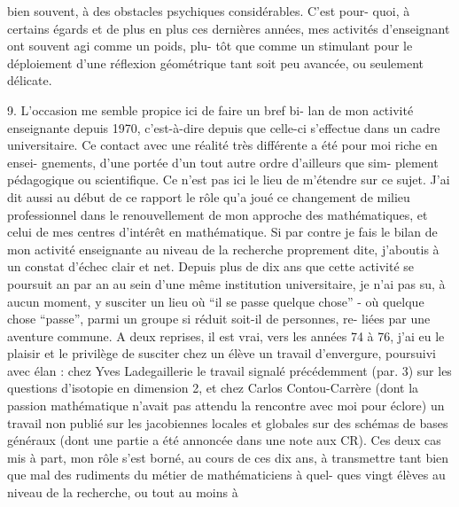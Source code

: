 
bien souvent, à des obstacles psychiques considérables. C'est pour-%
quoi, à certains égards et de plus en plus ces dernières années,
mes activités d'enseignant ont souvent agi comme un poids, plu-%
tôt que comme un stimulant pour le déploiement d'une réflexion
géométrique tant soit peu avancée, ou seulement délicate.

9. L'occasion me semble propice ici de faire un bref bi-%
lan de mon activité enseignante depuis 1970, c'est-à-dire depuis
que celle-ci s'effectue dans un cadre universitaire. Ce contact
avec une réalité très différente a été pour moi riche en ensei-%
gnements, d'une portée d'un tout autre ordre d'ailleurs que sim-%
plement pédagogique ou scientifique. Ce n'est pas ici le lieu de
m'étendre sur ce sujet. J'ai dit aussi au début de ce rapport le
rôle qu'a joué ce changement de milieu professionnel dans le
renouvellement de mon approche des mathématiques, et celui de mes
centres d'intérêt en mathématique. Si par contre je fais le bilan
de mon activité enseignante au niveau de la recherche proprement
dite, j'aboutis à un constat d'échec clair et net. Depuis plus
de dix ans que cette activité se poursuit an par an au sein d'une
même institution universitaire, je n'ai pas su, à aucun moment,
y susciter un lieu où ``il se passe quelque chose'' - où quelque
chose ``passe'', parmi un groupe si réduit soit-il de personnes, re-%
liées par une aventure commune. A deux reprises, il est vrai, vers
les années 74 à 76, j'ai eu le plaisir et le privilège de susciter
chez un élève un travail d'envergure, poursuivi avec élan : chez
Yves Ladegaillerie le travail signalé précédemment (par. 3) sur
les questions d'isotopie en dimension 2, et chez Carlos Contou-Carrère
(dont la passion mathématique n'avait pas attendu la rencontre
avec moi pour éclore) un travail non publié sur les jacobiennes
locales et globales sur des schémas de bases généraux (dont une
partie a été annoncée dans une note aux CR). Ces deux cas mis à
part, mon rôle s'est borné, au cours de ces dix ans, à transmettre
tant bien que mal des rudiments du métier de mathématiciens à quel-%
ques vingt élèves au niveau de la recherche, ou tout au moins à

